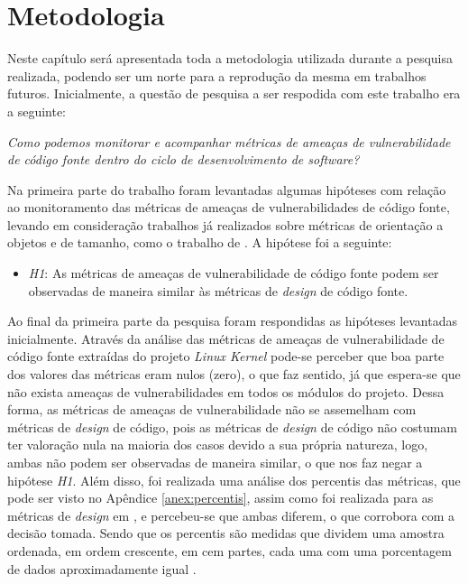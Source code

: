 \chapter{Metodologia}\label{metodologia}

Neste capítulo será apresentada toda a metodologia utilizada durante a
pesquisa realizada, podendo ser um norte para a reprodução da mesma em trabalhos
futuros. Inicialmente, a questão de pesquisa a ser respodida com este trabalho era a
seguinte:

\begin{center}
  \textit{Como podemos monitorar e acompanhar métricas de ameaças de
    vulnerabilidade de código fonte dentro do ciclo de desenvolvimento de
    software?
}
\end{center}

Na primeira parte do trabalho foram levantadas algumas hipóteses com relação ao
monitoramento das métricas de ameaças de vulnerabilidades de código fonte,
levando em consideração trabalhos já realizados sobre métricas de orientação a
objetos e de tamanho, como o trabalho de . A hipótese
foi a seguinte:

\begin{itemize}
  \item \textit{H1}: As métricas de ameaças de vulnerabilidade de código fonte
  podem ser observadas de maneira similar às métricas de \textit{design} de código
  fonte.
\end{itemize}

Ao final da primeira parte da pesquisa foram respondidas as hipóteses levantadas
inicialmente. Através da análise das métricas de ameaças de vulnerabilidade de
código fonte extraídas do projeto \textit{Linux Kernel} pode-se perceber que boa
parte dos valores das métricas eram nulos (zero), o que faz sentido, já que
espera-se que não exista ameaças de vulnerabilidades em todos os módulos do
projeto. Dessa forma, as métricas de ameaças de vulnerabilidade não se
assemelham com métricas de \textit{design} de código, pois as métricas de
\textit{design} de código não costumam ter valoração nula na maioria dos casos
devido a sua própria natureza, logo, ambas não podem ser observadas de maneira
similar, o que nos faz negar a hipótese \textit{H1}. Além disso, foi
realizada uma análise dos percentis das métricas, que pode ser visto no Apêndice
\ref{anex:percentis}, assim como foi realizada para as métricas de
\textit{design} em , e percebeu-se que ambas diferem,
o que corrobora com a decisão tomada. Sendo que os percentis são medidas que
dividem uma amostra ordenada, em ordem crescente, em cem partes, cada uma com
uma porcentagem de dados aproximadamente igual \cite{martins2013}.

